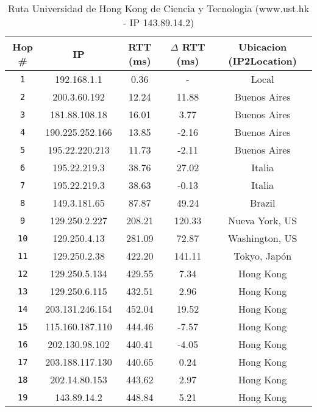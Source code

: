 \begin{table}[ht]\begin{center}
    \begin{tabular}{|c|c|c|c|c|}
    \hline
    \textbf{Hop \#} & \textbf{IP} & \textbf{RTT (ms)} & \textbf{$\Delta$ RTT (ms)} & \textbf{Ubicacion (IP2Location)} \\ \hline
    \texttt{1} &  192.168.1.1 & 0.36        &  -        & Local \\ \hline
    \texttt{2} &  200.3.60.192 & 12.24      & 11.88     & Buenos Aires \\ \hline
    \texttt{3} &  181.88.108.18 & 16.01     & 3.77      & Buenos Aires \\ \hline
    \texttt{4} &  190.225.252.166 & 13.85   & -2.16     & Buenos Aires \\ \hline
    \texttt{5} &  195.22.220.213 & 11.73    & -2.11     & Buenos Aires \\ \hline
    \texttt{6} &  195.22.219.3 & 38.76      & 27.02     & Italia \\ \hline
    \texttt{7} &  195.22.219.3 & 38.63      & -0.13     & Italia \\ \hline
    \texttt{8} &  149.3.181.65 & 87.87      & 49.24     & Brazil \\ \hline
    \texttt{9} &  129.250.2.227 & 208.21    & 120.33    & Nueva York, US \\ \hline
    \texttt{10} & 129.250.4.13 & 281.09     & 72.87     & Washington, US \\ \hline
    \texttt{11} & 129.250.2.38 & 422.20     & 141.11    & Tokyo, Japón \\ \hline
    \texttt{12} & 129.250.5.134 & 429.55    & 7.34      & Hong Kong \\ \hline
    \texttt{13} & 129.250.6.115 & 432.51    & 2.96      & Hong Kong \\ \hline
    \texttt{14} & 203.131.246.154 & 452.04  & 19.52     & Hong Kong \\ \hline
    \texttt{15} & 115.160.187.110 & 444.46  & -7.57     & Hong Kong \\ \hline
    \texttt{16} & 202.130.98.102 & 440.41   & -4.05     & Hong Kong \\ \hline
    \texttt{17} & 203.188.117.130 & 440.65  & 0.24      & Hong Kong \\ \hline
    \texttt{18} & 202.14.80.153 & 443.62    & 2.97      & Hong Kong \\ \hline
    \texttt{19} & 143.89.14.2 & 448.84      & 5.21      & Hong Kong \\ \hline
    \end{tabular}
    \caption{Ruta Universidad de Hong Kong de Ciencia y Tecnologia (www.ust.hk  - IP 143.89.14.2)}
\end{center}
\end{table}

